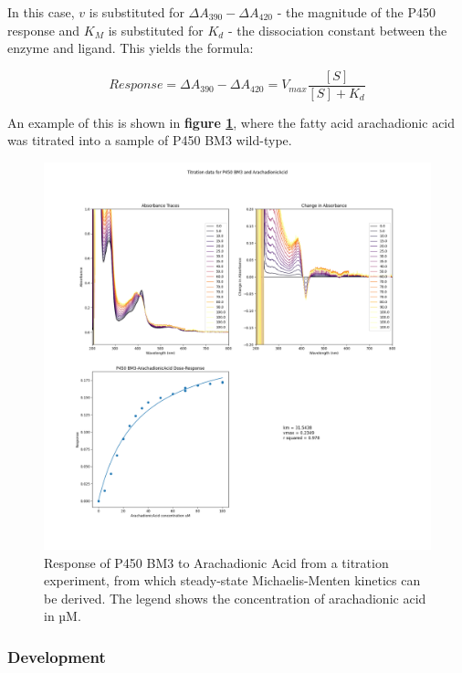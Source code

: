 \documentclass[16pt]{book}
\begin{document}
In this case, $v$ is substituted for $\Delta A_{390} - \Delta A_{420}$ - the magnitude of the P450 response and $K_M$ is substituted for $K_d$ - the dissociation constant between the enzyme and ligand.
This yields the formula:

\begin{equation}
	Response = \Delta A_{390} - \Delta A_{420} = V_{max} \frac{[S]}{[S] + K_d} 
\end{equation}

An example of this is shown in \textbf{figure \ref{arachadionictitration}}, where the fatty acid arachadionic acid was titrated into a sample of P450 BM3 wild-type.

\begin{figure}
	\caption{\label{arachadionictitration} Response of P450 BM3 to Arachadionic Acid from a titration experiment, from which steady-state Michaelis-Menten kinetics can be derived. The legend shows the concentration of arachadionic acid in µM.}
	\includegraphics[width = \textwidth]{img/ArachadionicAcid.png}
\end{figure}


\subsubsection{Development}
\end{document}
